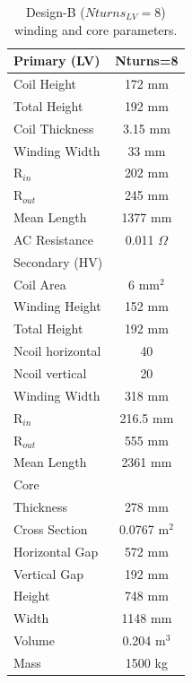 \documentclass[a4paper, 11pt]{article} %
\begin{document}
\begin{table}[]
\begin{center}
\begin{tabular}{lc}
Primary (LV) & Nturns=8\\
\hline
Coil Height & 172 mm \\
Total Height & 192 mm \\
Coil Thickness & 3.15 mm\\
Winding Width & 33 mm \\
R$_{in}$ & 202 mm \\
R$_{out}$ & 245 mm \\
Mean Length & 1377 mm \\
AC Resistance & 0.011 $\Omega$ \\
\hline
Secondary (HV) \\
Coil Area & 6 mm$^2$\\
Winding Height & 152 mm \\ 
Total Height & 192 mm \\
Ncoil horizontal & 40 \\
Ncoil vertical & 20 \\
Winding Width & 318 mm \\
R$_{in}$ & 216.5 mm \\
R$_{out}$ & 555 mm \\
Mean Length & 2361 mm \\
\hline
Core \\
Thickness & 278 mm \\
Cross Section & 0.0767 m$^2$\\
Horizontal Gap & 572 mm \\
Vertical Gap & 192 mm \\
Height & 748 mm \\
Width & 1148 mm \\
Volume & 0.204 m$^3$ \\
Mass & 1500 kg \\
\hline
\end{tabular} 
\end{center}
\caption{Design-B ($Nturns_{LV}=8$) winding and core parameters.}
\label{design_B}
\end{table}
\end{document}
